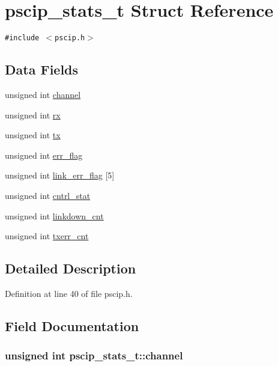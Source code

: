 \hypertarget{structpscip__stats__t}{
\section{pscip\_\-stats\_\-t Struct Reference}
\label{structpscip__stats__t}
}
{\tt \#include $<$pscip.h$>$}

\subsection*{Data Fields}
\begin{CompactItemize}
\item 
unsigned int \hyperlink{structpscip__stats__t_c647919d8c5ec4bbbc58be57109c99b3}{channel}
\item 
unsigned int \hyperlink{structpscip__stats__t_e46adfbf3c7f0a63c6c9674c3c4be6be}{rx}
\item 
unsigned int \hyperlink{structpscip__stats__t_4aea32dc480a098e93826eb3ee1ef8e0}{tx}
\item 
unsigned int \hyperlink{structpscip__stats__t_df6485c52099018d382850dc396c0d48}{err\_\-flag}
\item 
unsigned int \hyperlink{structpscip__stats__t_507d5bcb9f66993e4a643fa99e6670ca}{link\_\-err\_\-flag} \mbox{[}5\mbox{]}
\item 
unsigned int \hyperlink{structpscip__stats__t_4b258b817442484add900e9c0277bf35}{cntrl\_\-stat}
\item 
unsigned int \hyperlink{structpscip__stats__t_47a332aa892c703c615e8beb8ad8db09}{linkdown\_\-cnt}
\item 
unsigned int \hyperlink{structpscip__stats__t_462f1b9d8580e9540a8080cbdf9cb8d9}{txerr\_\-cnt}
\end{CompactItemize}


\subsection{Detailed Description}


Definition at line 40 of file pscip.h.

\subsection{Field Documentation}
\hypertarget{structpscip__stats__t_c647919d8c5ec4bbbc58be57109c99b3}{
\subsubsection[{channel}]{\setlength{\rightskip}{0pt plus 5cm}unsigned int {\bf pscip\_\-stats\_\-t::channel}}}
\label{structpscip__stats__t_c647919d8c5ec4bbbc58be57109c99b3}




